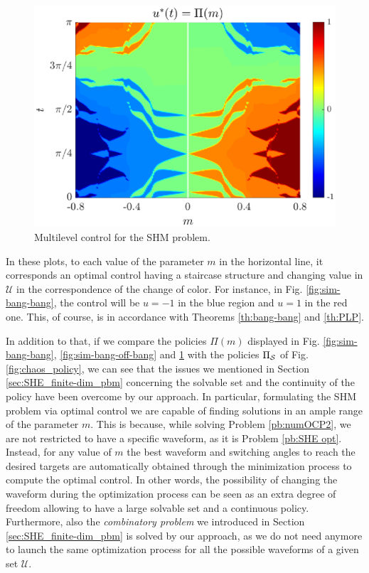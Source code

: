\documentclass[9pt,shortpaper,twoside,web]{ieeecolor}
\begin{document}
\begin{figure}[ht!]
	\hspace{0.05em}
	\includegraphics[scale=0.525]{img/fig08.eps}
	\caption{Multilevel control for the SHM problem.}\label{fig:sim-multi-level}
\end{figure} 

In these plots, to each value of the parameter $m$ in the horizontal line, it corresponds an optimal control having a staircase structure and changing value in $\mathcal U$ in the correspondence of the change of color. For instance, in Fig. \ref{fig:sim-bang-bang}, the control will be $u=-1$ in the blue region and $u=1$ in the red one. This, of course, is in accordance with Theorems \ref{th:bang-bang} and \ref{th:PLP}.

In addition to that, if we compare the policies $\Pi(m)$ displayed in Fig. \ref{fig:sim-bang-bang}, \ref{fig:sim-bang-off-bang} and \ref{fig:sim-multi-level} with the policies $\Pi_{\mathcal{S}}$ of Fig. \ref{fig:chaos_policy}, we can see that the issues we mentioned in Section \ref{sec:SHE_finite-dim_pbm} concerning the solvable set and the continuity of the policy have been overcome by our approach. In particular, formulating the SHM problem via optimal control we are capable of finding solutions in an ample range of the parameter $m$. This is because, while solving Problem \ref{pb:numOCP2}, we are not restricted to have a specific waveform, as it is Problem \ref{pb:SHE opt}. Instead, for any value of $m$ the best waveform and switching angles to reach the desired targets are automatically obtained through the minimization process to compute the optimal control. In other words, the possibility of changing the waveform during the optimization process can be seen as an extra degree of freedom allowing to have a large solvable set and a continuous policy. Furthermore, also the \textit{combinatory problem} we introduced in Section \ref{sec:SHE_finite-dim_pbm} is solved by our approach, as we do not need anymore to launch the same optimization process for all the possible waveforms of a given set $\mathcal U$. 
\end{document}
